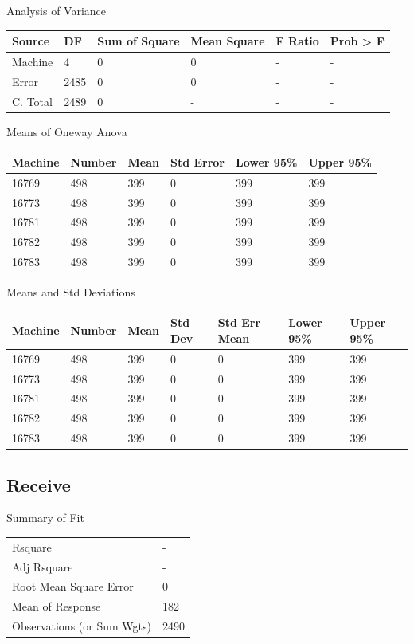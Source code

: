 \documentclass[12pt]{report}
\begin{document}
Analysis of Variance
\newline
\begin{tabular}{l | l | l | l | l | l}
Source&DF&Sum of Square&Mean Square&F Ratio&Prob > F \\
\hline
Machine&4&0&0&-&- \\
Error&2485&0&0&-&- \\
C. Total&2489&0&-&-&- \\
\end{tabular}
\newline

Means of Oneway Anova
\newline
\begin{tabular}{l | l | l | l | l | l}
Machine&Number&Mean&Std Error&Lower 95\%&Upper 95\% \\
\hline
16769&498&399&0&399&399 \\
16773&498&399&0&399&399 \\
16781&498&399&0&399&399 \\
16782&498&399&0&399&399 \\
16783&498&399&0&399&399 \\
\end{tabular}
\newline

Means and Std Deviations
\newline
\begin{tabular}{l | l | l | l | l | l | l}
Machine&Number&Mean&Std Dev&Std Err Mean&Lower 95\%&Upper 95\% \\
\hline
16769&498&399&0&0&399&399 \\
16773&498&399&0&0&399&399 \\
16781&498&399&0&0&399&399 \\
16782&498&399&0&0&399&399 \\
16783&498&399&0&0&399&399 \\
\end{tabular}
\newline

\subsection{Receive}
Summary of Fit
\newline
\begin{tabular}{l | l}
  Rsquare&- \\
  Adj Rsquare&- \\
  Root Mean Square Error&0 \\
  Mean of Response&182 \\
  Observations (or Sum Wgts)&2490 \\
\end{tabular}
\newline
\end{document}
